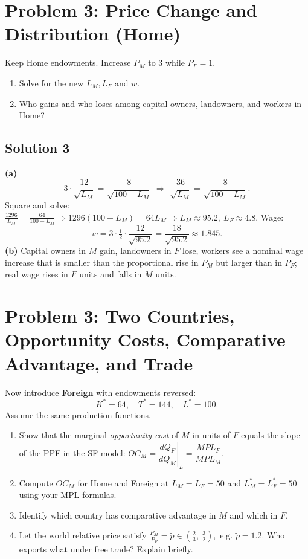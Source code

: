 \documentclass[12pt]{article}
\begin{document}
\bigskip

\section*{Problem 3: Price Change and Distribution (Home)}
Keep Home endowments. Increase $P_M$ to $3$ while $P_F=1$.
\begin{enumerate}
\item[(a)] Solve for the new $L_M,L_F$ and $w$.
\item[(b)] Who gains and who loses among capital owners, landowners, and workers in Home?
\end{enumerate}

\subsection*{Solution 3}
\textbf{(a)}
\[
3 \cdot \frac{12}{\sqrt{L_M}} = \frac{8}{\sqrt{100-L_M}}
\;\Rightarrow\; \frac{36}{\sqrt{L_M}}=\frac{8}{\sqrt{100-L_M}}.
\]
Square and solve:
\(
\frac{1296}{L_M}=\frac{64}{100-L_M}
\Rightarrow 1296(100-L_M)=64L_M
\Rightarrow L_M\approx 95.2,\ L_F\approx 4.8.
\)
Wage:
\[
w = 3 \cdot \tfrac12 \cdot \frac{12}{\sqrt{95.2}}
= \frac{18}{\sqrt{95.2}}
\approx 1.845.
\]
\textbf{(b)} Capital owners in $M$ gain, landowners in $F$ lose, workers see a nominal wage increase that is smaller than the proportional rise in $P_M$ but larger than in $P_F$; real wage rises in $F$ units and falls in $M$ units.

\bigskip
\newpage
\section*{Problem 3: Two Countries, Opportunity Costs, Comparative Advantage, and Trade}
Now introduce \textbf{Foreign} with endowments reversed:
\[
K^{*}=64,\quad T^{*}=144,\quad L^{*}=100.
\]
Assume the same production functions.

\begin{enumerate}
\item[(c)] Show that the marginal \emph{opportunity cost} of $M$ in units of $F$ equals the slope of the PPF in the SF model: \(
OC_M = \left.\dfrac{dQ_F}{dQ_M}\right|_{L} = \dfrac{MPL_F}{MPL_M}.
\)
\item[(d)] Compute $OC_M$ for Home and Foreign at $L_M=L_F=50$ and $L_M^{*}=L_F^{*}=50$ using your MPL formulas.
\item[(e)] Identify which country has comparative advantage in $M$ and which in $F$.
\item[(f)] Let the world relative price satisfy
\(
\frac{P_M}{P_F}=\tilde p \in \left(\frac{2}{3},\ \frac{3}{2}\right), \text{ e.g. } \tilde p=1.2.
\)
Who exports what under free trade? Explain briefly.
\end{enumerate}
\end{document}
